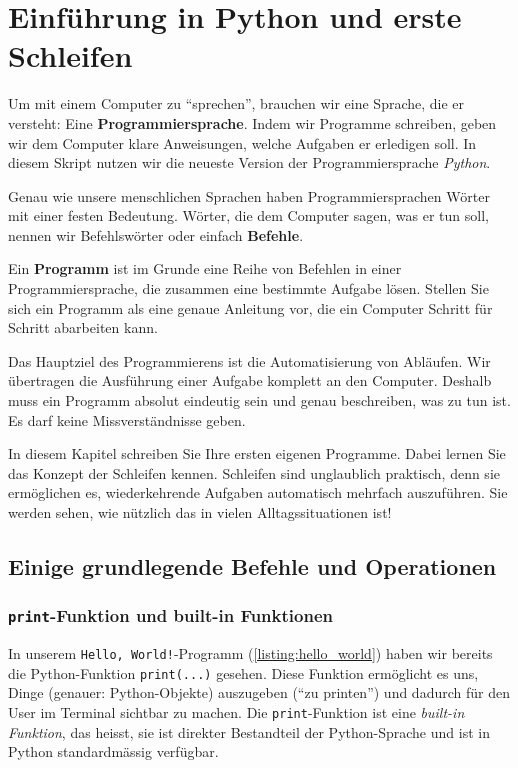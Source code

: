 \chapter{Einführung in Python und erste Schleifen}\label{ch:K02_Intro}


Um mit einem Computer zu \enquote{sprechen}, brauchen wir eine Sprache, die er versteht: Eine \textbf{Programmiersprache}. Indem wir Programme schreiben, geben wir dem Computer klare Anweisungen, welche Aufgaben er erledigen soll. In diesem Skript nutzen wir die neueste Version der Programmiersprache \emph{Python}.

Genau wie unsere menschlichen Sprachen haben Programmiersprachen Wörter mit einer festen Bedeutung. Wörter, die dem Computer sagen, was er tun soll, nennen wir Befehlswörter oder einfach \textbf{Befehle}.

Ein \textbf{Programm} ist im Grunde eine Reihe von Befehlen in einer Programmiersprache, die zusammen eine bestimmte Aufgabe lösen. Stellen Sie sich ein Programm als eine genaue Anleitung vor, die ein Computer Schritt für Schritt abarbeiten kann.

Das Hauptziel des Programmierens ist die Automatisierung von Abläufen. Wir übertragen die Ausführung einer Aufgabe komplett an den Computer. Deshalb muss ein Programm absolut eindeutig sein und genau beschreiben, was zu tun ist. Es darf keine Missverständnisse geben.

In diesem Kapitel schreiben Sie Ihre ersten eigenen Programme. Dabei lernen Sie das Konzept der Schleifen kennen. Schleifen sind unglaublich praktisch, denn sie ermöglichen es, wiederkehrende Aufgaben automatisch mehrfach auszuführen. Sie werden sehen, wie nützlich das in vielen Alltagssituationen ist!

\section{Einige grundlegende Befehle und Operationen}

\subsection{\texorpdfstring{\lstinline|print|}{print}-Funktion und built-in Funktionen}
In unserem \texttt{Hello, World!}-Programm (\cref{listing:hello_world}) haben wir bereits die Python-Funktion \lstinline|print(...)| gesehen.
Diese Funktion ermöglicht es uns, Dinge (genauer: Python-Objekte) auszugeben (\enquote{zu printen}) und dadurch für den User im Terminal sichtbar zu machen. Die \lstinline|print|-Funktion ist eine \emph{built-in Funktion}, das heisst, sie ist direkter Bestandteil der Python-Sprache und ist in Python standardmässig verfügbar.

